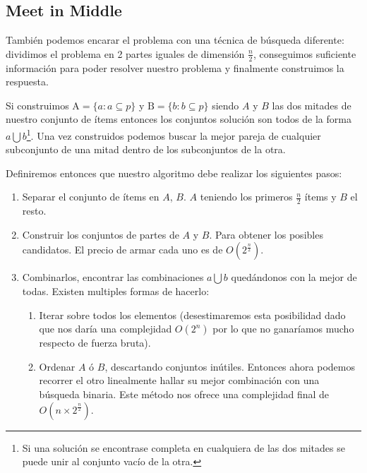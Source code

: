 \documentclass[fleqn, 11pt]{article}
\begin{document}
\subsection{Meet in Middle}

También podemos encarar el problema con una técnica de búsqueda diferente:
dividimos el problema en 2 partes iguales de dimensión $\frac{n}{2}$,
conseguimos suficiente información para poder resolver nuestro problema y
finalmente construimos la respuesta.

Si construimos $\text{A} = \{a : a \subseteq p\}$ y $\text{B} = \{b : b
\subseteq p\}$ siendo $A$ y $B$ las dos mitades de nuestro conjunto de ítems
entonces los conjuntos solución son todos de la forma $a \bigcup b$\footnote{Si
una solución se encontrase completa en cualquiera de las dos mitades se puede
unir al conjunto vacío de la otra.}. Una vez construidos podemos
buscar la mejor pareja de cualquier subconjunto de una mitad dentro de los
subconjuntos de la otra.

Definiremos entonces que nuestro algoritmo debe realizar los siguientes pasos:

\begin{enumerate}
\item Separar el conjunto de ítems en $A$, $B$. $A$ teniendo los primeros
$\frac{n}{2}$ ítems y $B$ el resto.

\item Construir los conjuntos de partes de $A$ y $B$. Para obtener los posibles
candidatos. El precio de armar cada uno es de $O(2^{\frac{n}{2}})$.

\item Combinarlos, encontrar las combinaciones $a \bigcup b$ quedándonos con la
mejor de todas. Existen multiples formas de hacerlo:

\begin{enumerate}
	\item Iterar sobre todos los elementos (desestimaremos esta posibilidad
	dado que nos daría una complejidad $O(2^n)$ por lo que no ganaríamos
	mucho respecto de fuerza bruta).

	\item Ordenar $A$ ó $B$, descartando conjuntos inútiles. Entonces ahora
	podemos recorrer el otro linealmente hallar su mejor combinación con
	una búsqueda binaria. Este método nos ofrece una complejidad final de
	$O(n \times 2^{\frac{n}{2}})$.
\end{enumerate}
\end{enumerate}
\end{document}
